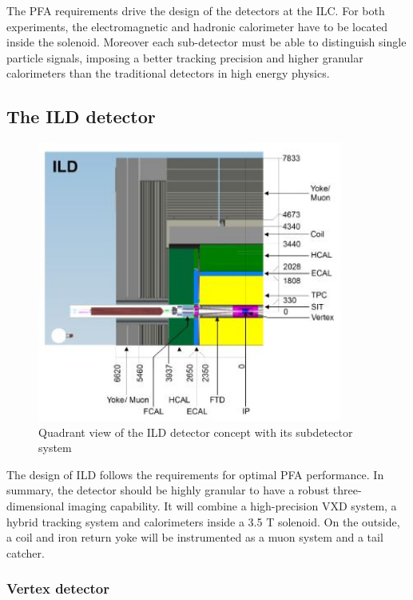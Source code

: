     The \gls{PFA} requirements drive the design of the detectors at the ILC.
    For both experiments, the electromagnetic and hadronic calorimeter have to be located inside the solenoid.
    Moreover each sub-detector must be able to distinguish single particle signals, imposing a better tracking precision and higher granular calorimeters than the traditional detectors in high energy physics.

    \subsection{The ILD detector}
    
    \begin{figure}[!h]
      \centering
      \includegraphics[width = 10cm]{Pictures/ILC/fig_ILD_Quadrant.png}
      \caption{Quadrant view of the ILD detector concept with its subdetector system \cite{Behnke2010}}
      \label{fig:ILD}
    \end{figure}

    The design of \gls{ILD} follows the requirements for optimal \gls{PFA} performance.
    In summary, the detector should be highly granular to have a robust three-dimensional imaging capability.
    It will combine a high-precision \gls{VXD} system, a hybrid tracking system and calorimeters inside a 3.5 T solenoid. 
    On the outside, a coil and iron return yoke will be instrumented as a muon system and a tail catcher.

      \subsubsection{Vertex detector}

